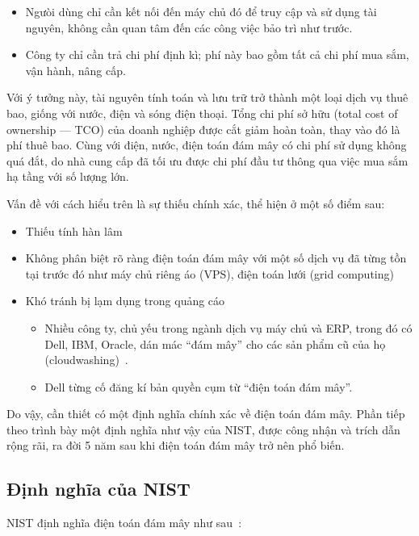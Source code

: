 \documentclass{article}
\begin{document}
\begin{itemize}
    \item Ngưòi dùng chỉ cần kết nối đến máy chủ đó để truy cập và sử dụng tài
        nguyên, không cần quan tâm đến các công việc bảo trì như trước.
    \item Công ty chỉ cần trả chi phí định kì; phí này bao gồm tất cả chi phí
        mua sắm, vận hành, nâng cấp.
\end{itemize}

Với ý tưởng này, tài nguyên tính toán và lưu trữ trở thành một loại dịch vụ thuê
bao, giống với nước, điện và sóng điện thoại. Tổng chi phí sở hữu (total cost of
ownership --- TCO) của doanh nghiệp được cắt giảm hoàn toàn, thay vào đó là phí
thuê bao. Cùng với điện, nước, điện toán đám mây có chi phí sử dụng không quá
đắt, do nhà cung cấp đã tối ưu được chi phí đầu tư thông qua việc mua sắm hạ
tầng với số lượng lớn.

Vấn đề với cách hiểu trên là sự thiếu chính xác, thể hiện ở một số điểm sau:

\begin{itemize}
    \item Thiếu tính hàn lâm
    \item Không phân biệt rõ ràng điện toán đám mây với một số dịch vụ đã từng
        tồn tại trước đó như máy chủ riêng áo (VPS), điện toán lưới (grid
        computing)
    \item Khó tránh bị lạm dụng trong quảng cáo
    \begin{itemize}
        \item Nhiều công ty, chủ yếu trong ngành dịch vụ máy chủ và ERP, trong
            đó có Dell, IBM, Oracle, dán mác ``đám mây'' cho các sản phẩm cũ của
            họ (cloudwashing)~\cite{MITTR2011}.
        \item  Dell từng cố đăng kí bản quyền cụm từ ``điện toán đám mây''.
    \end{itemize}
\end{itemize}

Do vậy, cần thiết có một định nghĩa chính xác về điện toán đám mây. Phần tiếp
theo trình bày một định nghĩa như vậy của NIST, được công nhận và trích dẫn rộng
rãi, ra đời 5 năm sau khi điện toán đám mây trở nên phổ biến.

\subsection{Định nghĩa của NIST}

NIST định nghĩa điện toán đám mây như sau~\cite{NIST2011}:
\end{document}
